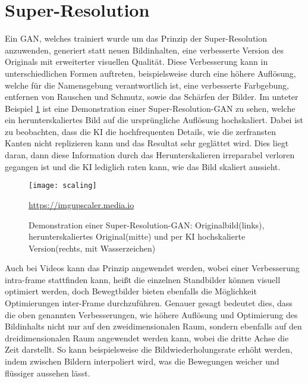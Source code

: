 \section{Super-Resolution}

\noindent Ein \ac{GAN}, welches trainiert wurde um das Prinzip der Super-Resolution anzuwenden, generiert statt neuen Bildinhalten, eine verbesserte Version des Originals mit erweiterter visuellen Qualität. Diese Verbesserung kann in unterschiedlichen Formen auftreten, beispielsweise durch eine höhere Auflösung, welche für die Namensgebung verantwortlich ist, eine verbesserte Farbgebung, entfernen von Rauschen und Schmutz, sowie das Schärfen der Bilder. Im unteter Beispiel \ref{fig:scaling} ist eine Demonstration einer Super-Resolution-GAN zu sehen, welche ein herunterskaliertes Bild auf die ursprüngliche Auflösung hochskaliert. Dabei ist zu beobachten, dass die KI die hochfrequenten Details, wie die zerfransten Kanten nicht replizieren kann und das Resultat sehr geglättet wird. Dies liegt daran, dann diese Information durch das Herunterskalieren irreparabel verloren gegangen ist und die KI lediglich raten kann, wie das Bild skaliert aussieht.\\


\begin{figure}[H]
    \centering
    \texttt{[image: scaling]}
    \caption{Demonstration einer Super-Resolution-GAN: Originalbild(links), herunterskaliertes Original(mitte) und per KI hochskalierte Version(rechts, mit Wasserzeichen)} \quelle\url{https://imgupscaler.media.io}
\label{fig:scaling}
\end{figure}


\noindent Auch bei Videos kann das Prinzip angewendet werden, wobei einer Verbesserung intra-frame stattfinden kann, heißt die einzelnen Standbilder können visuell optimiert werden, doch Bewegtbilder bieten ebenfalls die Möglichkeit Optimierungen inter-Frame durchzuführen. Genauer gesagt bedeutet dies, dass die oben genannten Verbesserungen, wie höhere Auflösung und Optimierung des Bildinhalts nicht nur auf den zweidimensionalen Raum, sondern ebenfalls auf den dreidimensionalen Raum angewendet werden kann, wobei die dritte Achse die Zeit darstellt. So kann beispielsweise die Bildwiederholungsrate erhöht werden, indem zwischen Bildern interpoliert wird, was die Bewegungen weicher und flüssiger aussehen lässt.  \\